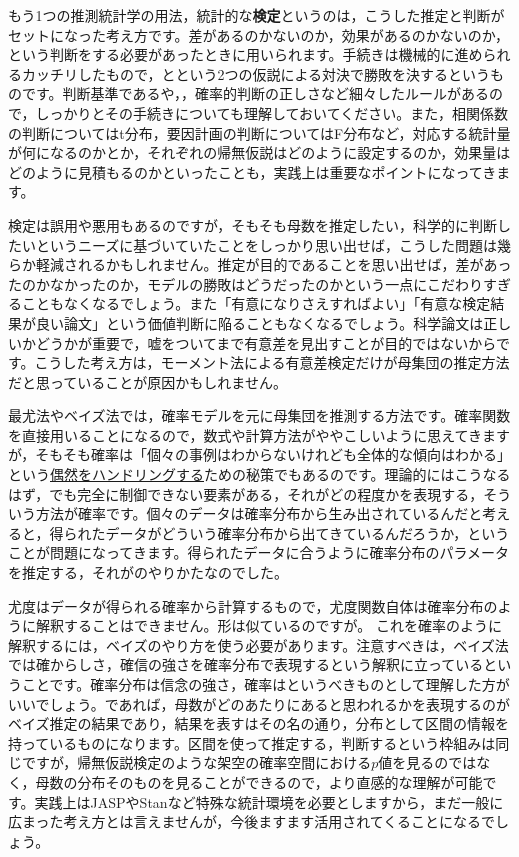 \documentclass{ltjbook}
\begin{document}
もう1つの推測統計学の用法，統計的な\textbf{検定}というのは，こうした推定と判断がセットになった考え方です。差があるのかないのか，効果があるのかないのか，という判断をする必要があったときに用いられます。手続きは機械的に進められるカッチリしたもので，とという2つの仮説による対決で勝敗を決するというものです。判断基準であるや，，確率的判断の正しさなど細々したルールがあるので，しっかりとその手続きについても理解しておいてください。また，相関係数の判断についてはt分布，要因計画の判断についてはF分布など，対応する統計量が何になるのかとか，それぞれの帰無仮説はどのように設定するのか，効果量はどのように見積もるのかといったことも，実践上は重要なポイントになってきます。

検定は誤用や悪用もあるのですが，そもそも母数を推定したい，科学的に判断したいというニーズに基づいていたことをしっかり思い出せば，こうした問題は幾らか軽減されるかもしれません。推定が目的であることを思い出せば，差があったのかなかったのか，モデルの勝敗はどうだったのかという一点にこだわりすぎることもなくなるでしょう。また「有意になりさえすればよい」「有意な検定結果が良い論文」という価値判断に陥ることもなくなるでしょう。科学論文は正しいかどうかが重要で，嘘をついてまで有意差を見出すことが目的ではないからです。こうした考え方は，モーメント法による有意差検定だけが母集団の推定方法だと思っていることが原因かもしれません。

最尤法やベイズ法では，確率モデルを元に母集団を推測する方法です。確率関数を直接用いることになるので，数式や計算方法がややこしいように思えてきますが，そもそも確率は「個々の事例はわからないけれども全体的な傾向はわかる」という\underline{偶然をハンドリングする}ための秘策でもあるのです。理論的にはこうなるはず，でも完全に制御できない要素がある，それがどの程度かを表現する，そういう方法が確率です。個々のデータは確率分布から生み出されているんだと考えると，得られたデータがどういう確率分布から出てきているんだろうか，ということが問題になってきます。得られたデータに合うように確率分布のパラメータを推定する，それがのやりかたなのでした。

尤度はデータが得られる確率から計算するもので，尤度関数自体は確率分布のように解釈することはできません。形は似ているのですが。
これを確率のように解釈するには，ベイズのやり方を使う必要があります。注意すべきは，ベイズ法では確からしさ，確信の強さを確率分布で表現するという解釈に立っているということです。確率分布は信念の強さ，確率はというべきものとして理解した方がいいでしょう。であれば，母数がどのあたりにあると思われるかを表現するのがベイズ推定の結果であり，結果を表すはその名の通り，分布として区間の情報を持っているものになります。区間を使って推定する，判断するという枠組みは同じですが，帰無仮説検定のような架空の確率空間における$p$値を見るのではなく，母数の分布そのものを見ることができるので，より直感的な理解が可能です。実践上はJASPやStanなど特殊な統計環境を必要としますから，まだ一般に広まった考え方とは言えませんが，今後ますます活用されてくることになるでしょう。
\end{document}
